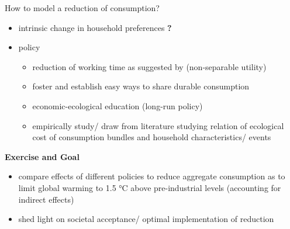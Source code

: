 \documentclass[11pt,aspectratio=169]{beamer}
\begin{document}
\begin{frame}{How to model a reduction of consumption?}
	\begin{itemize}[<+-| alert@+>]
		\item intrinsic change in household preferences \textbf{?}
		\item policy 
		\begin{itemize}
				\item reduction of working time as suggested by \cite{GoughCANGREEN} (non-separable utility)
				\item foster and establish easy ways to share durable consumption
				\item economic-ecological education (long-run policy)
	\item empirically study/ draw from literature studying relation of ecological cost of consumption bundles and household characteristics/ events 
		
	\end{itemize}
	\end{itemize}
\pause
\textbf{Exercise and Goal}
\begin{itemize}
\item compare effects of different policies to reduce aggregate consumption as to limit global warming to 1.5 °C above pre-industrial levels (accounting for indirect effects)
	\item shed light on  societal acceptance/ optimal implementation of reduction 
\end{itemize}
\end{frame}
\end{document}
